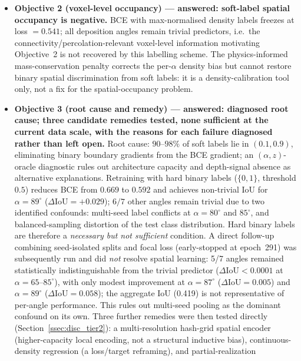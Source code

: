 \documentclass[aip,amsmath,amssymb,reprint]{revtex4-1}
\renewcommand{\ang}{\ensuremath{\alpha}} %
\newcommand{\iou}{\ensuremath{\mathrm{IoU}}}
\begin{document}
\begin{itemize}
  \item \textbf{Objective 2 (voxel-level occupancy) — answered:
    soft-label spatial occupancy is negative.}
    BCE with max-normalised density labels freezes at loss $= 0.541$;
    all deposition angles remain trivial predictors, i.e.\ the
    connectivity/percolation-relevant voxel-level information
    motivating Objective~2 is not recovered by this labelling
    scheme.
    The physics-informed mass-conservation penalty corrects the
    per-$\alpha$ density bias but cannot restore binary spatial
    discrimination from soft labels: it is a density-calibration
    tool only, not a fix for the spatial-occupancy problem.

  \item \textbf{Objective 3 (root cause and remedy) — answered:
    diagnosed root cause; three candidate remedies tested, none
    sufficient at the current data scale, with the reasons for each
    failure diagnosed rather than left open.}
    Root cause: $90$--$98\%$ of soft labels lie in $(0.1,0.9)$,
    eliminating binary boundary gradients from the BCE gradient;
    an $(\alpha,z)$-oracle diagnostic rules out architecture
    capacity and depth-signal absence as alternative explanations.
    Retraining with hard binary labels ($\{0,1\}$, threshold $0.5$)
    reduces BCE from $0.669$ to $0.592$ and achieves non-trivial
    IoU for $\ang = 89^{\circ}$ ($\Delta\iou = +0.029$); $6/7$ other angles
    remain trivial due to two identified confounds: multi-seed
    label conflicts at $\ang = 80^{\circ}$ and $85^{\circ}$, and
    balanced-sampling distortion of the test class distribution.
    Hard binary labels are therefore a \emph{necessary but not
    sufficient} condition.
    A direct follow-up combining seed-isolated splits and focal
    loss (early-stopped at epoch~291) was subsequently run and did
    \emph{not} resolve spatial learning: 5/7 angles remained
    statistically indistinguishable from the trivial predictor
    ($\Delta\iou < 0.0001$ at $\ang = 65$--$85^{\circ}$), with only modest
    improvement at $\ang = 87^{\circ}$ ($\Delta\iou = 0.005$) and
    $\ang = 89^{\circ}$ ($\Delta\iou = 0.058$); the aggregate IoU (0.419)
    is not representative of per-angle performance.
    This rules out multi-seed pooling as the dominant confound on
    its own. Three further remedies were then tested directly
    (Section~\ref{ssec:disc_tier2}): a multi-resolution hash-grid
    spatial encoder (higher-capacity local encoding, not a structural
    inductive bias), continuous-density
    regression (a loss/target reframing), and partial-realization

\end{itemize}
\end{document}
